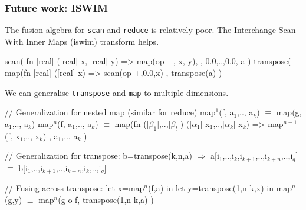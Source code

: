 \documentclass{beamer}
\newcommand{\emp}[1]{\textcolor{DikuRed}{ #1}}
\newcommand{\emphh}[1]{\textcolor{CosGreen}{ #1}}
\newcommand{\mymath}[1]{$ #1 $}
\newcommand{\myindx}[1]{_{#1}}
\newcommand{\myindu}[1]{^{#1}}
\begin{document}
\begin{frame}[fragile,t]
\frametitle{Future work: ISWIM}

The fusion algebra for {\tt scan} and {\tt reduce} is relatively poor.
The Interchange Scan With Inner Maps ({\sc iswim}) transform helps.

\begin{colorcode}
scan( fn [real] ([real] x, [real] y) => map(op +, x, y),
     , {0.0,..,0.0}, a )
transpose( map(fn [real] ([real] x) => scan(op +,0.0,x)
         , transpose(a) )
\end{colorcode}
\pause
We can generalise {\tt transpose} and {\tt map} to multiple
dimensions.

\begin{colorcode}
// \emp{Generalization for nested map (similar for reduce)}
map\mymath{\myindu{1}}(f, a\mymath{\myindx{1}},.., a\mymath{\myindx{k}}) \emphh{\mymath{\equiv}} map(g, a\mymath{\myindx{1}},.., a\mymath{\myindx{k}})
map\mymath{\myindu{n}}(f, a\mymath{\myindx{1}},.., a\mymath{\myindx{k}}) \emphh{\mymath{\equiv}} map(fn ([\mymath{\beta\myindx{1}}],..,[\mymath{\beta\myindx{t}}]) ([\mymath{\alpha\myindx{1}}] x\mymath{\myindx{1}},..,[\mymath{\alpha\myindx{k}}] x\mymath{\myindx{k}}) =>
                            map\mymath{\myindu{n-1}}(f, x\mymath{\myindx{1}},.., x\mymath{\myindx{k}}) , a\mymath{\myindx{1}},.., a\mymath{\myindx{k}} )

// \emp{Generalization for transpose}:
b=transpose(k,n,a) \mymath{\Rightarrow} a[i\mymath{\myindx{1}},..,i\mymath{\myindx{k}},i\mymath{\myindx{k+1}},..,i\mymath{\myindx{k+n}},..,i\mymath{\myindx{q}}] \emphh{\mymath{\equiv}}
                      b[i\mymath{\myindx{1}},..,i\mymath{\myindx{k+1}},..,i\mymath{\myindx{k+n}},i\mymath{\myindx{k}},..,i\mymath{\myindx{q}}]

// \emp{Fusing across transpose}:
let x=map\mymath{\myindu{n}}(f,a) in let y=transpose(1,n-k,x) in map\mymath{\myindu{n}}(g,y)
        \emphh{\mymath{\equiv}} map\mymath{\myindu{n}}(g o f, transpose(1,n-k,a) )
\end{colorcode}

\end{frame}
\end{document}
